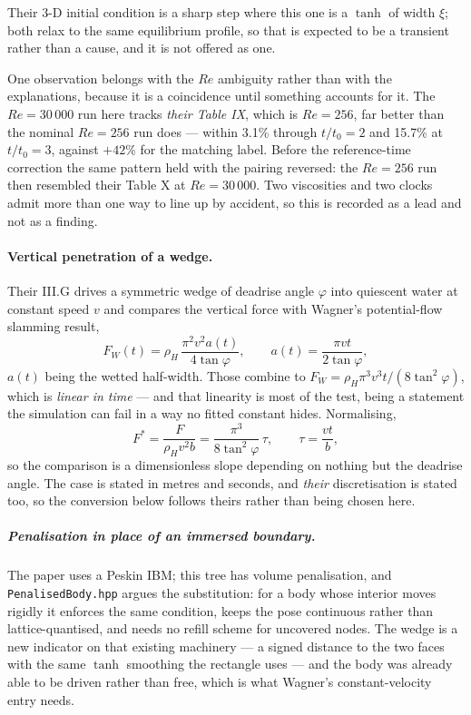 \documentclass[11pt,a4paper]{article}
\newcommand{\code}[1]{\texttt{\small #1}}
\begin{document}
Their 3-D initial condition is a sharp step where this one is a $\tanh$ of
width $\xi$; both relax to the same equilibrium profile, so that is expected to
be a transient rather than a cause, and it is not offered as one.

One observation belongs with the $Re$ ambiguity rather than with the
explanations, because it is a coincidence until something accounts for it. The
$Re=30\,000$ run here tracks \emph{their Table IX}, which is $Re=256$, far
better than the nominal $Re=256$ run does --- within 3.1\% through $t/t_0=2$
and 15.7\% at $t/t_0=3$, against $+42\%$ for the matching label. Before the
reference-time correction the same pattern held with the pairing reversed: the
$Re=256$ run then resembled their Table X at $Re=30\,000$. Two viscosities and
two clocks admit more than one way to line up by accident, so this is recorded
as a lead and not as a finding.

\paragraph{Vertical penetration of a wedge.} Their III.G drives a symmetric
wedge of deadrise angle $\varphi$ into quiescent water at constant speed $v$
and compares the vertical force with Wagner's potential-flow slamming result,
\[
  F_W(t) = \rho_H\,\frac{\pi^2 v^2 a(t)}{4\tan\varphi},
  \qquad a(t) = \frac{\pi v t}{2\tan\varphi},
\]
$a(t)$ being the wetted half-width. Those combine to
$F_W = \rho_H \pi^3 v^3 t/(8\tan^2\varphi)$, which is \emph{linear in time} ---
and that linearity is most of the test, being a statement the simulation can
fail in a way no fitted constant hides. Normalising,
\[
  F^* = \frac{F}{\rho_H v^2 b} = \frac{\pi^3}{8\tan^2\varphi}\,\tau,
  \qquad \tau = \frac{v t}{b},
\]
so the comparison is a dimensionless slope depending on nothing but the
deadrise angle. The case is stated in metres and seconds, and \emph{their}
discretisation is stated too, so the conversion below follows theirs rather
than being chosen here.

\subparagraph{Penalisation in place of an immersed boundary.} The paper uses a
Peskin IBM; this tree has volume penalisation, and \code{PenalisedBody.hpp}
argues the substitution: for a body whose interior moves rigidly it enforces
the same condition, keeps the pose continuous rather than lattice-quantised,
and needs no refill scheme for uncovered nodes. The wedge is a new indicator on
that existing machinery --- a signed distance to the two faces with the same
$\tanh$ smoothing the rectangle uses --- and the body was already able to be
driven rather than free, which is what Wagner's constant-velocity entry needs.
\end{document}
